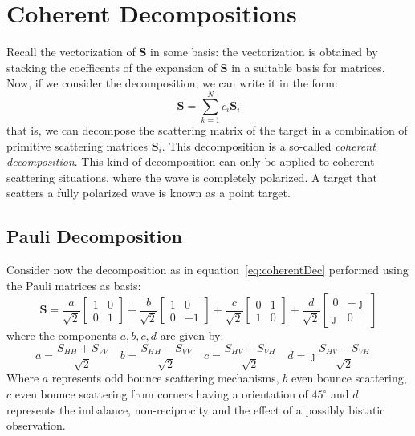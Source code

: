 \documentclass[11pt]{article}
\begin{document}
\section{Coherent Decompositions}
Recall the vectorization of $\mathbf{S}$ in some basis: the vectorization is obtained by stacking the coefficents of the expansion of $\mathbf{S}$ in a suitable basis for matrices. Now, if we consider the decomposition, we can write it in the form:
\begin{equation}\label{eq:coherentDec}
	\mathbf{S} = \sum\limits_{k = 1}^{N} c_{i}\mathbf{S}_{i}
\end{equation}
that is, we can decompose the scattering matrix of the target in a combination of primitive scattering matrices $\mathbf{S}_{i}$. This decomposition is a so-called \emph{coherent decomposition}. This kind of decomposition can only be applied to coherent scattering situations, where the wave is completely polarized. A target that scatters a fully polarized wave is known as a point target.\\
\subsection{Pauli Decomposition}
Consider now the decomposition as in equation~\ref{eq:coherentDec} performed using the Pauli matrices as basis:
\begin{equation}
	\mathbf{S} = 
	\frac{a}{\sqrt{2}}
	\begin{bmatrix}
		1 & 0\\
		0 & 1
	\end{bmatrix}
	+
	\frac{b}{\sqrt{2}}
	\begin{bmatrix}
		1 & 0\\
		0 & -1
	\end{bmatrix}
	+
	\frac{c}{\sqrt{2}}
	\begin{bmatrix}
		0 & 1\\
		1 & 0
	\end{bmatrix}	
	+
	\frac{d}{\sqrt{2}}
	\begin{bmatrix}
		0 & -\jmath\\
		\jmath & 0
	\end{bmatrix}
\end{equation}
where the components $a,b,c,d$ are given by:
\begin{equation}
	a=\frac{S_{HH}+S_{VV}}{\sqrt{2}}\quad
	b=\frac{S_{HH}-S_{VV}}{\sqrt{2}}\quad
	c=\frac{S_{HV}+S_{VH}}{\sqrt{2}}\quad
	d=\jmath\frac{S_{HV}-S_{VH}}{\sqrt{2}}\quad
\end{equation}
Where $a$ represents odd bounce scattering mechanisms, $b$ even bounce scattering, $c$ even bounce scattering from corners having a orientation of $45^{\circ}$ and $d$ represents the imbalance, non-reciprocity and the effect of a possibly bistatic observation.
\end{document}
